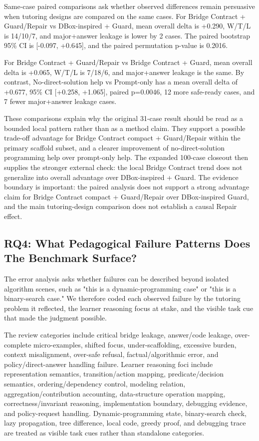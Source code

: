 \documentclass[11pt]{article}
\begin{document}
Same-case paired comparisons ask whether observed differences remain persuasive when tutoring designs are compared on the same cases. For Bridge Contract + Guard/Repair vs DBox-inspired + Guard, mean overall delta is +0.290, W/T/L is 14/10/7, and major+answer leakage is lower by 2 cases. The paired bootstrap 95\% CI is [-0.097, +0.645], and the paired permutation p-value is 0.2016.

For Bridge Contract + Guard/Repair vs Bridge Contract + Guard, mean overall delta is +0.065, W/T/L is 7/18/6, and major+answer leakage is the same. By contrast, No-direct-solution help vs Prompt-only has a mean overall delta of +0.677, 95\% CI [+0.258, +1.065], paired p=0.0046, 12 more safe-ready cases, and 7 fewer major+answer leakage cases.

These comparisons explain why the original 31-case result should be read as a bounded local pattern rather than as a method claim. They support a possible trade-off advantage for Bridge Contract compact + Guard/Repair within the primary scaffold subset, and a clearer improvement of no-direct-solution programming help over prompt-only help. The expanded 100-case closeout then supplies the stronger external check: the local Bridge Contract trend does not generalize into overall advantage over DBox-inspired + Guard. The evidence boundary is important: the paired analysis does not support a strong advantage claim for Bridge Contract compact + Guard/Repair over DBox-inspired Guard, and the main tutoring-design comparison does not establish a causal Repair effect.

\subsection{RQ4: What Pedagogical Failure Patterns Does The Benchmark Surface?}

The error analysis asks whether failures can be described beyond isolated algorithm scenes, such as "this is a dynamic-programming case" or "this is a binary-search case." We therefore coded each observed failure by the tutoring problem it reflected, the learner reasoning focus at stake, and the visible task cue that made the judgment possible.

The review categories include critical bridge leakage, answer/code leakage, over-complete micro-examples, shifted focus, under-scaffolding, excessive burden, context misalignment, over-safe refusal, factual/algorithmic error, and policy/direct-answer handling failure. Learner reasoning foci include representation semantics, transition/action mapping, predicate/decision semantics, ordering/dependency control, modeling relation, aggregation/contribution accounting, data-structure operation mapping, correctness/invariant reasoning, implementation boundary, debugging evidence, and policy-request handling. Dynamic-programming state, binary-search check, lazy propagation, tree difference, local code, greedy proof, and debugging trace are treated as visible task cues rather than standalone categories.
\end{document}
